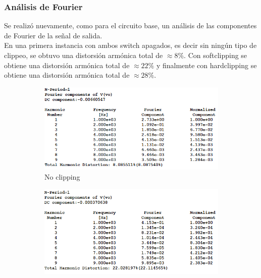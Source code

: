 \subsubsection{Análisis de Fourier}
Se realizó nuevamente, como para el circuito base, un análisis de las componentes de Fourier de la señal de salida.\\

En una primera instancia con ambos switch apagados, es decir sin ningún tipo de clippeo, se obtuvo una distorsión armónica total de $\approx 8\%$. Con softclipping se obtiene una distorsión armónica total de $\approx 22\%$ y finalmente con hardclipping se obtiene una distorsión armónica total de $\approx 28\%$.

\begin{figure}[H]
     \centering
     \begin{subfigure}[H]{0.8\textwidth}
         \centering
         \includegraphics[width=\textwidth, trim={0 0 0 0}, clip]{Ejercicio5/Imagenes/Circuito_base/Sim/circuito_propuesto_fourier_alone.png}
         \caption{No clipping}
         \label{fig:four_alone}
     \end{subfigure}
     \hfill
     \begin{subfigure}[H]{0.8\textwidth}
         \centering
         \includegraphics[width=\textwidth, trim={0 0 0 0}, clip]{Ejercicio5/Imagenes/Circuito_base/Sim/circuito_propuesto_fourier_soft.png}

\end{subfigure}
\end{figure}
